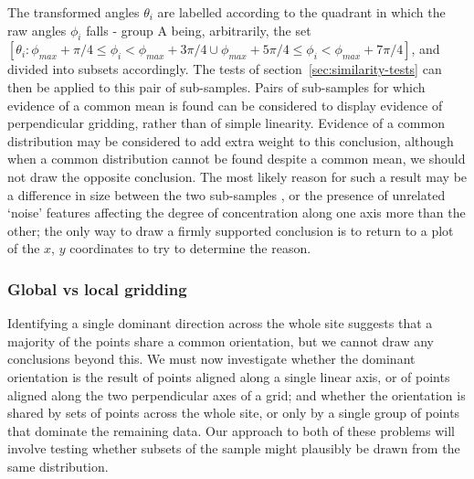 \documentclass[../../ArchStats.tex]{subfiles}
\begin{document}
The transformed angles $\theta_i$ are labelled according to the quadrant in which the raw angles $\phi_i$ falls - group A being, arbitrarily, the set  $[\theta_i: \phi_{max} + \pi/4 \leq \phi_i < \phi_{max} + 3\pi/4 \cup \phi_{max} + 5\pi/4 \leq \phi_i < \phi_{max} + 7\pi/4]$, and divided into subsets accordingly. The tests of section~\ref{sec:similarity-tests} can then be applied to this pair of sub-samples. Pairs of sub-samples for which evidence of a common mean is found can be considered to display evidence of perpendicular gridding, rather than of simple linearity. Evidence of a common distribution may be considered to add extra weight to this conclusion, although when a common distribution cannot be found despite a common mean, we should not draw the opposite conclusion. The most likely reason for such a result may be a difference in size between the two sub-samples , or the presence of unrelated `noise' features affecting the degree of concentration along one axis more than the other; the only way to draw a firmly supported conclusion is to return to a plot of the $x$, $y$ coordinates to try to determine the reason. 

\subsubsection{Global vs local gridding}
\label{sec:global-gridding}



Identifying a single dominant direction across the whole site suggests that a majority of the points share a common orientation, but we cannot draw any conclusions beyond this. We must now investigate whether the dominant orientation is the result of points aligned along a single linear axis, or of points aligned along the two perpendicular axes of a grid; and whether the orientation is shared by sets of points across the whole site, or only by a single group of points that dominate the remaining data. Our approach to both of these problems will involve testing whether subsets of the sample might plausibly be drawn from the same distribution.

\end{document}
